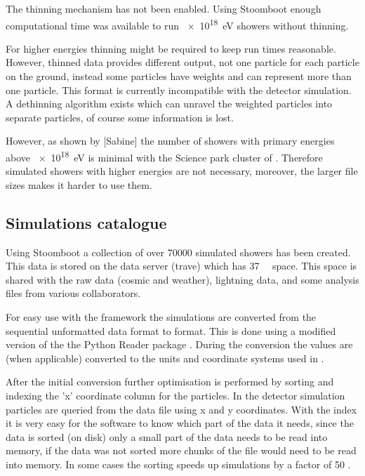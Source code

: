 The thinning mechanism has not been enabled. Using Stoomboot enough
computational time was available to run \SI{e18}{\electronvolt} showers without thinning.

For higher energies thinning might be required to keep run times
reasonable. However, thinned data provides different output, not one
particle for each particle on the ground, instead some particles have weights and can represent more than one particle. This format is currently incompatible with the detector simulation. A dethinning algorithm exists \cite{stokes2012} which can unravel the weighted particles into separate particles, of course some information is lost.

However, as shown by [Sabine] the number of showers with primary energies above \SI{e18}{\electronvolt} is minimal with the Science park cluster of \hisparc. Therefore simulated showers with higher energies are not necessary, moreover, the larger file sizes makes it harder to use them.


\subsection{Simulations catalogue}

Using Stoomboot a collection of over \num{70000} simulated showers has
been created. This data is stored on the \hisparc data server (trave)
which has \SI{37}{\tera\byte} space. This space is shared with the raw
\hisparc data (cosmic and weather), \knmi lightning data, and some analysis files from various \hisparc collaborators.

For easy use with the \sapphire framework the \corsika simulations are
converted from the sequential unformatted \fortran data format to \hdf format. This is done using a modified version of the the Python \corsika Reader package \cite{gonzalez2011}. During the conversion the values are
(when applicable) converted to the units and coordinate systems used in
.

After the initial conversion further optimisation is performed by
sorting and indexing the 'x' coordinate column for the particles. In the
detector simulation particles are queried from the \corsika data file
using x and y coordinates. With the index it is very easy for the
software to know which part of the data it needs, since the data is
sorted (on disk) only a small part of the data needs to be read into
memory, if the data was not sorted more chunks of the file would need to
be read into memory. In some cases the sorting speeds up simulations by
a factor of 50 \cite{pytables:optimization}.

